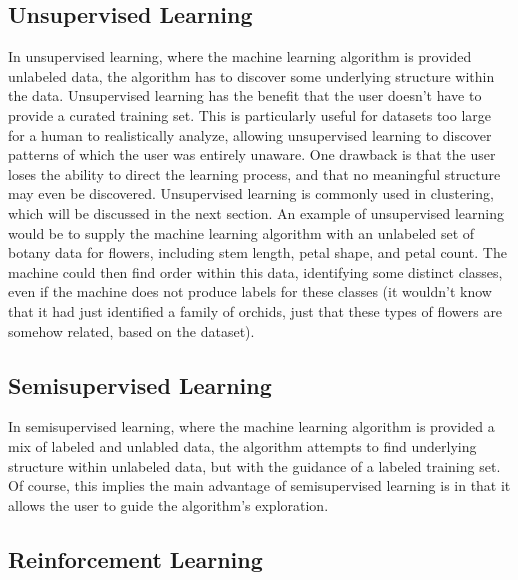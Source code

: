 
\subsection{Unsupervised Learning} %

In unsupervised learning, where the machine learning algorithm is provided unlabeled data, the algorithm has to discover some underlying structure within the data. Unsupervised learning has the benefit that the user doesn't have to provide a curated training set. This is particularly useful for datasets too large for a human to realistically analyze, allowing unsupervised learning to discover patterns of which the user was entirely unaware. One drawback is that the user loses the ability to direct the learning process, and that no meaningful structure may even be discovered. Unsupervised learning is commonly used in clustering, which will be discussed in the next section. An example of unsupervised learning would be to supply the machine learning algorithm with an unlabeled set of botany data for flowers, including stem length, petal shape, and petal count. The machine could then find order within this data, identifying some distinct classes, even if the machine does not produce labels for these classes (it wouldn't know that it had just identified a family of orchids, just that these types of flowers are somehow related, based on the dataset).


\subsection{Semisupervised Learning} %

In semisupervised learning, where the machine learning algorithm is provided a mix of labeled and unlabled data, the algorithm attempts to find underlying structure within unlabeled data, but with the guidance of a labeled training set. Of course, this implies the main advantage of semisupervised learning is in that it allows the user to guide the algorithm's exploration. 


\subsection{Reinforcement Learning} %

